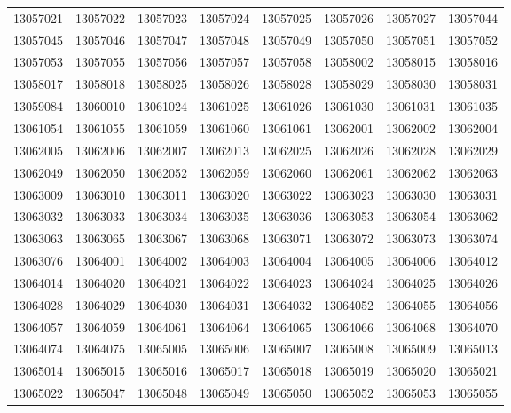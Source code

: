 \documentclass[letterpaper, abstract = on,listof=totoc, bibliography=totoc]{scrreprt}
\begin{document}
{\begin{longtable}{cccccccc}
13057021  &  13057022  &  13057023  &  13057024  &  13057025  &  13057026  &  13057027  &  13057044  \\ 
13057045  &  13057046  &  13057047  &  13057048  &  13057049  &  13057050  &  13057051  &  13057052  \\ 
13057053  &  13057055  &  13057056  &  13057057  &  13057058  &  13058002  &  13058015  &  13058016  \\ 
13058017  &  13058018  &  13058025  &  13058026  &  13058028  &  13058029  &  13058030  &  13058031  \\ 
13059084  &  13060010  &  13061024  &  13061025  &  13061026  &  13061030  &  13061031  &  13061035  \\ 
13061054  &  13061055  &  13061059  &  13061060  &  13061061  &  13062001  &  13062002  &  13062004  \\ 
13062005  &  13062006  &  13062007  &  13062013  &  13062025  &  13062026  &  13062028  &  13062029  \\ 
13062049  &  13062050  &  13062052  &  13062059  &  13062060  &  13062061  &  13062062  &  13062063  \\ 
13063009  &  13063010  &  13063011  &  13063020  &  13063022  &  13063023  &  13063030  &  13063031  \\ 
13063032  &  13063033  &  13063034  &  13063035  &  13063036  &  13063053  &  13063054  &  13063062  \\ 
13063063  &  13063065  &  13063067  &  13063068  &  13063071  &  13063072  &  13063073  &  13063074  \\ 
13063076  &  13064001  &  13064002  &  13064003  &  13064004  &  13064005  &  13064006  &  13064012  \\ 
13064014  &  13064020  &  13064021  &  13064022  &  13064023  &  13064024  &  13064025  &  13064026  \\ 
13064028  &  13064029  &  13064030  &  13064031  &  13064032  &  13064052  &  13064055  &  13064056  \\ 
13064057  &  13064059  &  13064061  &  13064064  &  13064065  &  13064066  &  13064068  &  13064070  \\ 
13064074  &  13064075  &  13065005  &  13065006  &  13065007  &  13065008  &  13065009  &  13065013  \\ 
13065014  &  13065015  &  13065016  &  13065017  &  13065018  &  13065019  &  13065020  &  13065021  \\ 
13065022  &  13065047  &  13065048  &  13065049  &  13065050  &  13065052  &  13065053  &  13065055  \\ 

\end{longtable}}
\end{document}
